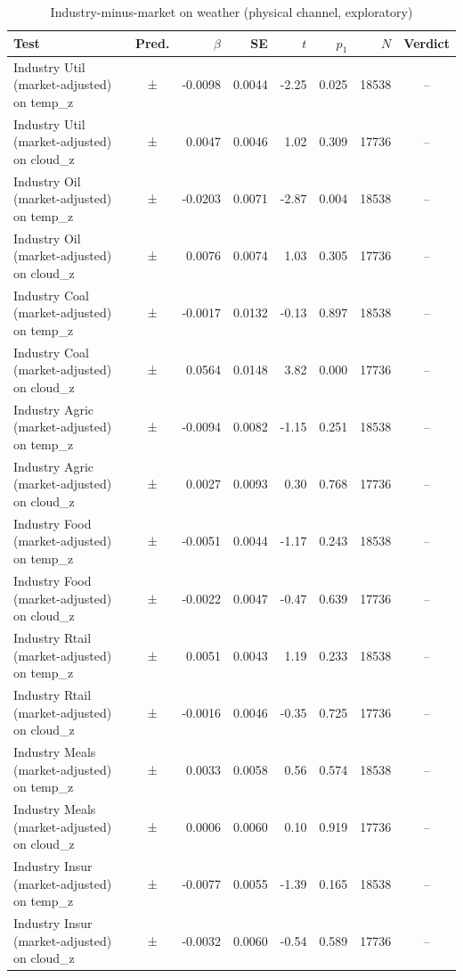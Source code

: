 \begin{table}[htbp]\centering\small
\caption{Industry-minus-market on weather (physical channel, exploratory)}
\begin{tabular}{lcrrrrrc}\toprule
Test & Pred. & $\beta$ & SE & $t$ & $p_{1}$ & $N$ & Verdict \\ \midrule
Industry Util (market-adjusted) on temp_z & ± & -0.0098 & 0.0044 & -2.25 & 0.025 & 18538 & -- \\
Industry Util (market-adjusted) on cloud_z & ± & 0.0047 & 0.0046 & 1.02 & 0.309 & 17736 & -- \\
Industry Oil (market-adjusted) on temp_z & ± & -0.0203 & 0.0071 & -2.87 & 0.004 & 18538 & -- \\
Industry Oil (market-adjusted) on cloud_z & ± & 0.0076 & 0.0074 & 1.03 & 0.305 & 17736 & -- \\
Industry Coal (market-adjusted) on temp_z & ± & -0.0017 & 0.0132 & -0.13 & 0.897 & 18538 & -- \\
Industry Coal (market-adjusted) on cloud_z & ± & 0.0564 & 0.0148 & 3.82 & 0.000 & 17736 & -- \\
Industry Agric (market-adjusted) on temp_z & ± & -0.0094 & 0.0082 & -1.15 & 0.251 & 18538 & -- \\
Industry Agric (market-adjusted) on cloud_z & ± & 0.0027 & 0.0093 & 0.30 & 0.768 & 17736 & -- \\
Industry Food (market-adjusted) on temp_z & ± & -0.0051 & 0.0044 & -1.17 & 0.243 & 18538 & -- \\
Industry Food (market-adjusted) on cloud_z & ± & -0.0022 & 0.0047 & -0.47 & 0.639 & 17736 & -- \\
Industry Rtail (market-adjusted) on temp_z & ± & 0.0051 & 0.0043 & 1.19 & 0.233 & 18538 & -- \\
Industry Rtail (market-adjusted) on cloud_z & ± & -0.0016 & 0.0046 & -0.35 & 0.725 & 17736 & -- \\
Industry Meals (market-adjusted) on temp_z & ± & 0.0033 & 0.0058 & 0.56 & 0.574 & 18538 & -- \\
Industry Meals (market-adjusted) on cloud_z & ± & 0.0006 & 0.0060 & 0.10 & 0.919 & 17736 & -- \\
Industry Insur (market-adjusted) on temp_z & ± & -0.0077 & 0.0055 & -1.39 & 0.165 & 18538 & -- \\
Industry Insur (market-adjusted) on cloud_z & ± & -0.0032 & 0.0060 & -0.54 & 0.589 & 17736 & -- \\
\bottomrule\end{tabular}\end{table}
